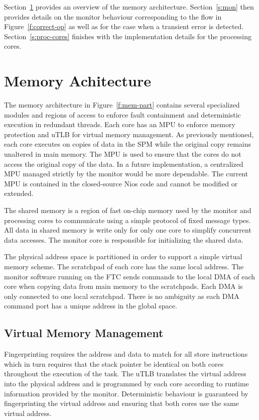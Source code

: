 
	Section~\ref{s:mem-arch} provides an overview of the memory architecture. 
	Section~\ref{s:mon} then provides details on the monitor behaviour corresponding to the flow in Figure~\ref{f:correct-op} as well as for the case when a transient error is detected.
	Section~\ref{s:proc-cores} finishes with the implementation details for the processing cores.

\section{Memory Achitecture}
\label{s:mem-arch}
	The memory architecture in Figure~\ref{f:mem-part} contains several specialized modules and regions of access to enforce fault containment and deterministic execution in redundant threads. 
	Each core has an MPU to enforce memory protection and uTLB for virtual memory management. 
	As previously mentioned, each core executes on copies of data in the SPM while the original copy remains unaltered in main memory. 
	The MPU is used to ensure that the cores do not access the original copy of the data. 
	In a future implementation, a centralized MPU managed strictly by the monitor would be more dependable. 
	The current MPU is contained in the closed-source Nios code and cannot be modified or extended. 

	The shared memory is a region of fast on-chip memory used by the monitor and processing cores to communicate using a simple protocol of fixed message types. 
	All data in shared memory is write only for only one core to simplify concurrent data accesses. 
	The monitor core is responsible for initializing the shared data. %

	The physical address space is partitioned in order to support a simple virtual memory scheme. 
	The scratchpad of each core has the same local address. 
	The monitor software running on the FTC sends commands to the local DMA of each core when copying data from main memory to the scratchpads. 
	Each DMA is only connected to one local scratchpad. 
	There is no ambiguity as each DMA command port has a unique address in the global space. 

\subsection{Virtual Memory Management}
\label{s:virt-mem}
	Fingerprinting requires the address and data to match for all store instructions which in turn requires that the stack pointer be identical on both cores throughout the execution of the task. 
	The uTLB translates the virtual address into the physical address and is programmed by each core according to runtime information provided by the monitor. 		
	Deterministic behaviour is guaranteed by fingerprinting the virtual address and ensuring that both cores use the same virtual address. 

